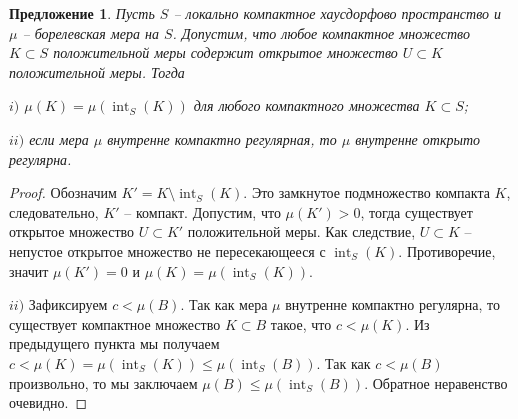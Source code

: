 \documentclass[12pt]{article}
\newtheorem{proposition}[theorem]{Предложение}
\begin{document}
\begin{proposition}\label{NormalMeasCharac} Пусть $S$ -- локально компактное хаусдорфово пространство и $\mu$ -- борелевская мера на $S$. Допустим, что любое компактное множество $K\subset S$ положительной меры содержит открытое множество $U\subset K$ положительной меры. Тогда

    $i)$ $\mu(K)=\mu(\operatorname{int}_S(K))$ для любого компактного множества $K\subset S$;

    $ii)$ если мера $\mu$ внутренне компактно регулярная, то $\mu$ внутренне открыто регулярна.
\end{proposition}
\begin{proof} Обозначим $K'=K\setminus \operatorname{int}_S(K)$. Это замкнутое подмножество компакта $K$, следовательно, $K'$ -- компакт. Допустим, что $\mu(K')>0$, тогда существует открытое множество $U\subset K'$ положительной меры. Как следствие, $U\subset K$ -- непустое открытое множество не пересекающееся с $\operatorname{int}_S(K)$. Противоречие, значит $\mu(K')=0$ и $\mu(K)=\mu(\operatorname{int}_S(K))$.

    $ii)$ Зафиксируем $c<\mu(B)$. Так как мера $\mu$ внутренне компактно регулярна, то существует компактное множество $K\subset B$ такое, что $c<\mu(K)$. Из предыдущего пункта мы получаем $c<\mu(K)=\mu(\operatorname{int}_S(K))\leq\mu(\operatorname{int}_S(B))$. Так как $c<\mu(B)$ произвольно, то мы заключаем $\mu(B)\leq\mu(\operatorname{int}_S(B))$. Обратное неравенство очевидно.
\end{proof}
\end{document}
